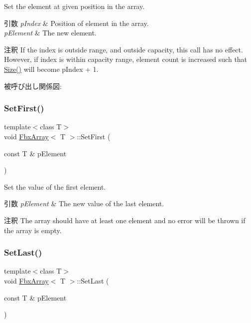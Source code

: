 Set the element at given position in the array. 
\begin{DoxyParams}{引数}
{\em p\+Index} & Position of element in the array. \\
\hline
{\em p\+Element} & The new element. \\
\hline
\end{DoxyParams}
\begin{DoxyRemark}{注釈}
If the index is outside range, and outside capacity, this call has no effect. However, if index is within capacity range, element count is increased such that \hyperlink{class_fbx_array_aa76a0ceaf4b13a2acec7c0cdd1c08362}{Size()} will become p\+Index + 1. 
\end{DoxyRemark}
被呼び出し関係図\+:
\mbox{\label{class_fbx_array_a774337e192792ec62ec89739399860f2}} 
\subsubsection{\texorpdfstring{Set\+First()}{SetFirst()}}
{\footnotesize\ttfamily template$<$class T$>$ \\
void \hyperlink{class_fbx_array}{Fbx\+Array}$<$ T $>$\+::Set\+First (\begin{DoxyParamCaption}\item[{const T \&}]{p\+Element }\end{DoxyParamCaption})}

Set the value of the first element. 
\begin{DoxyParams}{引数}
{\em p\+Element} & The new value of the last element. \\
\hline
\end{DoxyParams}
\begin{DoxyRemark}{注釈}
The array should have at least one element and no error will be thrown if the array is empty. 
\end{DoxyRemark}
\mbox{\label{class_fbx_array_ae7fe05cc12ae00d74dd8db0ea8b6ca31}} 
\subsubsection{\texorpdfstring{Set\+Last()}{SetLast()}}
{\footnotesize\ttfamily template$<$class T$>$ \\
void \hyperlink{class_fbx_array}{Fbx\+Array}$<$ T $>$\+::Set\+Last (\begin{DoxyParamCaption}\item[{const T \&}]{p\+Element }\end{DoxyParamCaption})}

